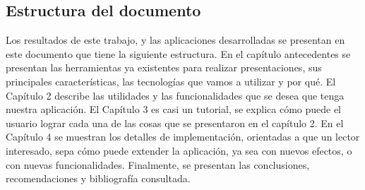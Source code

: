 \begin{introduction}
	\section*{Estructura del documento}
		Los resultados de este trabajo, y las aplicaciones desarrolladas se presentan en este documento que tiene la siguiente estructura. En el capítulo antecedentes se presentan las herramientas ya existentes para realizar presentaciones, sus principales características, las tecnologías que vamos a utilizar y por qué. El Capítulo 2 describe las utilidades y las funcionalidades que se desea que tenga nuestra aplicación. El Capítulo 3 es casi un tutorial, se explica cómo puede el usuario lograr cada una de las cosas que se presentaron en el capítulo 2. En el Capítulo 4 se muestran los detalles de implementación, orientadas a que un lector interesado, sepa cómo puede extender la aplicación, ya sea con nuevos efectos, o con nuevas funcionalidades. Finalmente, se presentan las conclusiones, recomendaciones y bibliografía consultada.






\end{introduction}




